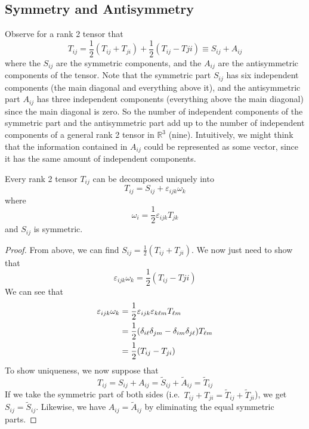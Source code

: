 \subsection{Symmetry and Antisymmetry}
Observe for a rank 2 tensor that
\[ T_{ij} = \frac{1}{2}\left( T_{ij} + T_{ji} \right) + \frac{1}{2}\left( T_{ij} - T{ji} \right) \equiv S_{ij} + A_{ij} \]
where the \(S_{ij}\) are the symmetric components, and the \(A_{ij}\) are the antisymmetric components of the tensor. Note that the symmetric part \(S_{ij}\) has six independent components (the main diagonal and everything above it), and the antisymmetric part \(A_{ij}\) has three independent components (everything above the main diagonal) since the main diagonal is zero. So the number of independent components of the symmetric part and the antisymmetric part add up to the number of independent components of a general rank 2 tensor in \(\mathbb R^3\) (nine). Intuitively, we might think that the information contained in \(A_{ij}\) could be represented as some vector, since it has the same amount of independent components.
\begin{proposition}
	Every rank 2 tensor \(T_{ij}\) can be decomposed uniquely into
	\[ T_{ij} = S_{ij} + \varepsilon_{ijk} \omega_k \]
	where
	\[ \omega_i = \frac{1}{2}\varepsilon_{ijk} T_{jk} \]
	and \(S_{ij}\) is symmetric.
\end{proposition}
\begin{proof}
	From above, we can find \(S_{ij} = \frac{1}{2}\left( T_{ij} + T_{ji} \right)\). We now just need to show that
	\[ \varepsilon_{ijk} \omega_k = \frac{1}{2}\left( T_{ij} - T{ji} \right) \]
	We can see that
	\begin{align*}
		\varepsilon_{ijk} \omega_k & = \frac{1}{2}\varepsilon_{ijk} \varepsilon_{k\ell m} T_{\ell m}                      \\
		                           & = \frac{1}{2}\qty(\delta_{i\ell} \delta_{jm} - \delta_{im}\delta_{j\ell}) T_{\ell m} \\
		                           & = \frac{1}{2}\qty(T_{ij} - T_{ji})
	\end{align*}
	To show uniqueness, we now suppose that
	\[ T_{ij} = S_{ij} + A_{ij} = \widetilde{S}_{ij} + \widetilde{A}_{ij} = \widetilde{T}_{ij} \]
	If we take the symmetric part of both sides (i.e.\ \(T_{ij} + T_{ji} = \widetilde{T}_{ij} + \widetilde{T}_{ji}\)), we get \(S_{ij} = \widetilde{S}_{ij}\). Likewise, we have \(A_{ij} = \widetilde{A}_{ij}\) by eliminating the equal symmetric parts.
\end{proof}

